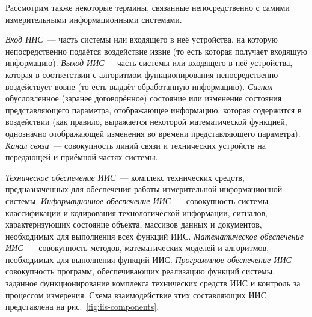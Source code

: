 \documentclass[a4paper, 14pt, titlepage]{extarticle}
\newcommand{\term}[1]{\emph{#1}}
\newenvironment{myfigure}[2]%
    {\pushQED{\caption{#1} \label{#2}} %
     \begin{figure}[!htb]\centering } %
    {  \popQED %
     \end{figure}}
\begin{document}
  \begin{myfigure}{структурная схема алгоритма измерения}{fig:meas-algo}
  \end{myfigure}

  Рассмотрим также некоторые термины, связанные непосредственно с самими измерительными информационными
  системами.

  \term{Вход ИИС}~--- часть системы или входящего в неё устройства, на которую непосредственно
  подаётся воздействие извне (то есть которая получает входящую информацию).
  \term{Выход ИИС}~---часть системы или входящего в неё устройства, которая в соответствии с
  алгоритмом функционирования непосредственно воздействует вовне (то есть выдаёт обработанную информацию).
  \term{Сигнал}~--- обусловленное (заранее договорённое) состояние или изменение состояния
  представляющего параметра, отображающее информацию, которая содержится в воздействии (как правило,
  выражается некоторой математической функцией, однозначно отображающей изменения во времени
  представляющего параметра).
  \term{Канал связи}~--- совокупность линий связи и технических устройств на передающей и приёмной
  частях системы.

  \term{Техническое обеспечение ИИС}~--- комплекс технических средств, предназначенных для
  обеспечения работы измерительной информационной системы.
  \term{Информационное обеспечение ИИС}~--- совокупность системы классификации и кодирования
  технологической информации, сигналов, характеризующих состояние объекта,
  массивов данных и документов, необходимых для выполнения всех функций ИИС.
  \term{Математическое обеспечение ИИС}~--- совокупность методов, математических моделей и алгоритмов,
  необходимых для выполнения функций ИИС.
  \term{Программное обеспечение ИИС}~--- совокупность программ, обеспечивающих реализацию функций
  системы, заданное функционирование комплекса технических средств ИИС и контроль за процессом измерения.
  Схема взаимодействие этих составляющих ИИС представлена на рис.~\ref{fig:iis-components}.
\end{document}
